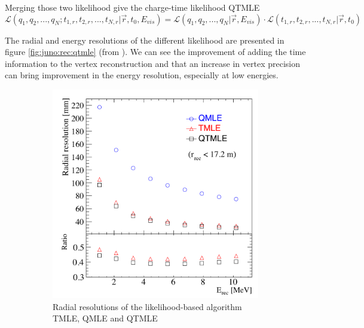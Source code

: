 Merging those two likelihood give the charge-time likelihood QTMLE
\begin{equation}
  \mathcal{L}(q_1, q_2, ..., q_N; t_{1,r}, t_{2,r}, ..., t_{N,r} | \vec{r}, t_0 , E_{vis}) = \mathcal{L}(q_1, q_2, ..., q_N | \vec{r}, E_{vis}) \cdot \mathcal{L}(t_{1,r}, t_{2,r}, ..., t_{N,r} | \vec{r}, t_0)
\end{equation}

The radial and energy resolutions of the different likelihood are presented in figure \ref{fig:juno:rec:qtmle} (from \cite{huang_data-driven_2023}). We can see the improvement of adding the time information to the vertex reconstruction and that an increase in vertex precision can bring improvement in the energy resolution, especially at low energies.

\begin{figure}[ht]
  \begin{subfigure}{0.48\linewidth}
    \centering
    \includegraphics[width=\textwidth]{images/juno/reco/radial_qtmle.png}
    \caption{Radial resolutions of the likelihood-based algorithm TMLE, QMLE and QTMLE}
  \end{subfigure}
  \hfill
  \begin{subfigure}{0.48\linewidth}
    \centering

\end{subfigure}
\end{figure}
